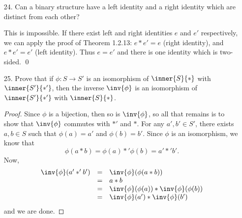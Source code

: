 \documentclass[letterpaper]{article}
\begin{document}
\begin{enumerate}
\answer The proof of Theorem 1.2.13 uses one identity as a left identity, and the other as a right identity. We can't do this here, and given two (WLOG) left identities $e$ and $e'$, we have no reason to believe that $e*e'=e'*e$, so while $e*e'=e'$ and $e'*e=e$, we cannot conclude that $e=e'$. Following is a table that give a counterexample: 
\[\begin{array}{c!c|c|c|c}
* & e & e'& a & b \\ \thickhline
e & e & e'& a & b \\ \hline
e'& e & e'& a & b \\ \hline
a & e'& a & b & e \\ \hline
b & a & b & e & e'\\ 
\end{array}\]
Note that $a*e=e'$ while $a*e'=a$, so since we cannot violate the substitution property of equality, we can see that $e\neq e'$. \qed

\item[24.] Can a binary structure have a left identity and a right identity which are distinct from each other?

\answer This is impossible. If there exist left and right identities $e$ and $e'$ respectively, we can apply the proof of Theorem 1.2.13: $e*e'=e$ (right identity), and $e*e'=e'$ (left identity). Thus $e=e'$ and there is one identity which is two-sided. \qed

\item[25.] Prove that if $\phi:S\to S'$ is an isomorphism of $\inner{S}{*}$ with $\inner{S'}{*'}$, then the inverse $\inv{\phi}$ is an isomorphism of $\inner{S'}{*'}$ with $\inner{S}{*}$. 

\begin{proof}
Since $\phi$ is a bijection, then so is $\inv{\phi}$, so all that remains is to show that $\inv{\phi}$ commutes with $*'$ and $*$. For any $a',b'\in S'$, there exists $a,b\in S$ such that $\phi(a)=a'$ and $\phi(b)=b'$. Since $\phi$ is an isomorphism, we know that 
$$\phi(a*b)=\phi(a)*'\phi(b)=a'*'b'.$$
Now, 
\[\begin{array}{rcl}
\inv{\phi}(a'*'b')&=& \inv{\phi}(\phi(a*b))\\

&=&a*b\\
&=&\inv{\phi}(\phi(a))*\inv{\phi}(\phi(b))\\
&=&\inv{\phi}(a')*\inv{\phi}(b')\\
\end{array}\]
and we are done.
\end{proof}


\end{enumerate}
\end{document}
